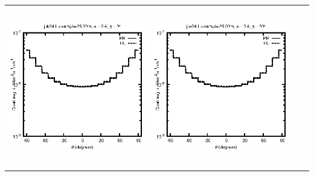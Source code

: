 \begin{tabular}{c c c c}
\includegraphics[height=7cm]{../eps/jok04_Lu_sample_25.00m_fwd.eps} &
\includegraphics[height=7cm]{../eps/jok04_Lu_sample_25.00m_cross.eps} \\
\end{tabular}

\pagebreak


